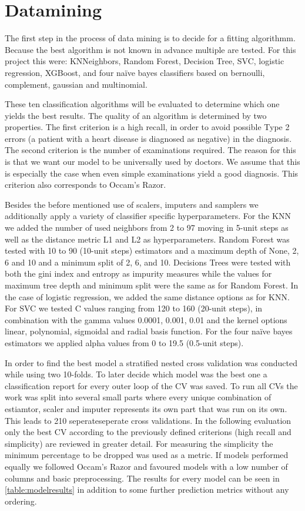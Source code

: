 \section{Datamining} \label{sec:datamining}
The first step in the process of data mining is to decide for a fitting algorithmm. Because the best algorithm is not known in advance multiple are tested. For this project this were: KNNeighbors, Random Forest, Decision Tree, SVC, logistic regression, XGBoost, and four naïve bayes classifiers based on bernoulli, complement, gaussian  and multinomial.

These ten classification algorithms will be evaluated to determine which one yields the best results. The quality of an algorithm is determined by two properties. The first criterion is a high recall, in order to avoid possible Type 2 errors (a patient with a heart disease is diagnosed as negative) in the diagnosis. The second criterion is the number of examinations required. The reason for this is that we want our model to be universally used by doctors. We assume that this is especially the case when even simple examinations yield a good diagnosis. This criterion also corresponds to Occam’s Razor.

Besides the before mentioned use of scalers, imputers and samplers we additionally apply a variety of classifier specific hyperparameters. For the KNN we added the number of used neighbors from 2 to 97 moving in 5-unit steps as well as the distance metric L1 and L2 as hyperparameters. Random Forest was tested with 10 to 90 (10-unit steps) estimators and a maximum depth of None, 2, 6 and 10 and a minimum split of 2, 6, and 10. Decisions Trees were tested with both the gini index and entropy as impurity measures while the values for maximum tree depth and minimum split were the same as for Random Forest. In the case of logistic regression, we added the same distance options as for KNN. For SVC we tested C values ranging from 120 to 160 (20-unit steps), in combination with the gamma values 0.0001, 0.001, 0.01 and the kernel options linear, polynomial, sigmoidal and radial basis function. For the four naïve bayes estimators we applied alpha values from 0 to 19.5 (0.5-unit steps).

In order to find the best model a stratified nested cross validation was conducted while using two 10-folds. To later decide which model was the best one a classification report for every outer loop of the CV was saved. To run all CVs the work was split into several small parts where every unique combination of estiamtor, scaler and imputer represents its own part that was run on its own. This leads to 210 seperateseperate cross validations. In the following evaluation only the best CV according to the previously defined criterions (high recall and simplicity) are reviewed in greater detail. For measuring the simplicity the minimum percentage to be dropped was used as a metric. If models performed equally we followed Occam's Razor and favoured models with a low number of columns and basic preprocessing. The results for every model can be seen in \cref{table:modelresults} in addition to some further prediction metrics without any ordering.



